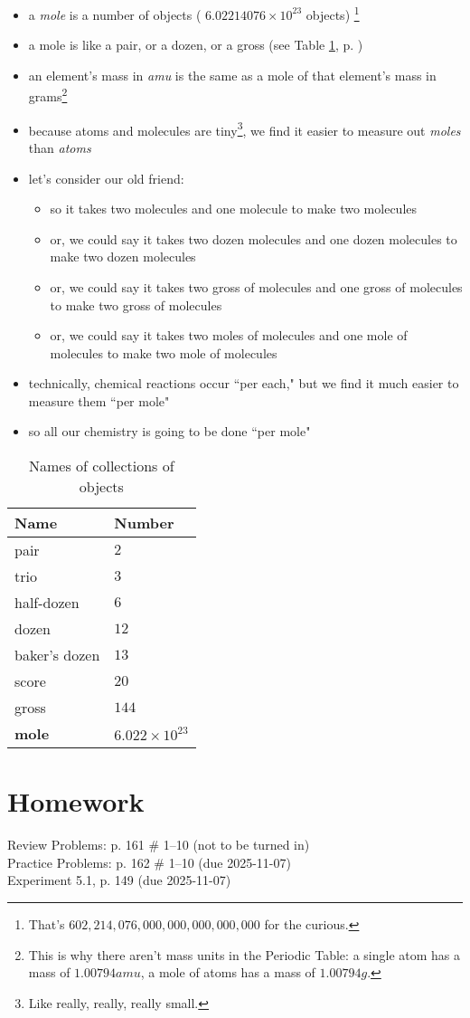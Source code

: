 \documentclass[11pt, oneside]{article}   	%
\begin{document}
\begin{itemize}
\item a \emph{mole} is a number of objects ( $6.02214076 \times 10^{23}$ objects) \footnote{That's $ 602,214,076,000,000,000,000,000 $ for the curious.}
\item a mole is like a pair, or a dozen, or a gross (see Table \ref{table:collections:names}, p. \pageref{table:collections:names})
\item an element's mass in \emph{amu} is the same as a mole of that element's mass in grams\footnote{This is why there aren't mass units in the Periodic Table: a single  atom has a mass of $1.00794 amu$, a mole of  atoms has a mass of $1.00794 g$.}
\item because atoms and molecules are tiny\footnote{Like really, really, really small.}, we find it easier to measure out \emph{moles} than \emph{atoms}
\item let's consider our old friend: 
\begin{itemize}
\item so it takes two  molecules and one  molecule to make two  molecules
\item or, we could say it takes two dozen  molecules and one dozen  molecules to make two dozen  molecules
\item or, we could say it takes two gross of  molecules and one gross of  molecules to make two gross of  molecules
\item or, we could say it takes two moles of  molecules and one mole of  molecules to make two mole of  molecules
\end{itemize}
\item technically, chemical reactions occur ``per each," but we find it much easier to measure them ``per mole"
\item so all our chemistry is going to be done ``per mole" 
\end{itemize}

\begin{table}[ph]
\centering
\begin{tabular}[b]{l|l}
\hline
Name & Number \\
\hline
pair  & $2$ \\
trio  & $3$ \\ 
half-dozen & $6$ \\
dozen & $12$ \\
baker's dozen & $13$ \\
score & $20$ \\
gross & $144$ \\
\textbf{mole}   & \textbf{$6.022 \times 10^{23}$}\\
\end{tabular}
\caption{Names of collections of objects}
\label{table:collections:names}
\end{table}


\section{Homework}
Review Problems: p. 161 \# 1--10 (not to be turned in)\\
Practice Problems: p. 162 \# 1--10 (due 2025-11-07)\\
Experiment 5.1, p. 149 (due 2025-11-07)\\


\nocite{wile-chem-2}
{}

\end{document}
